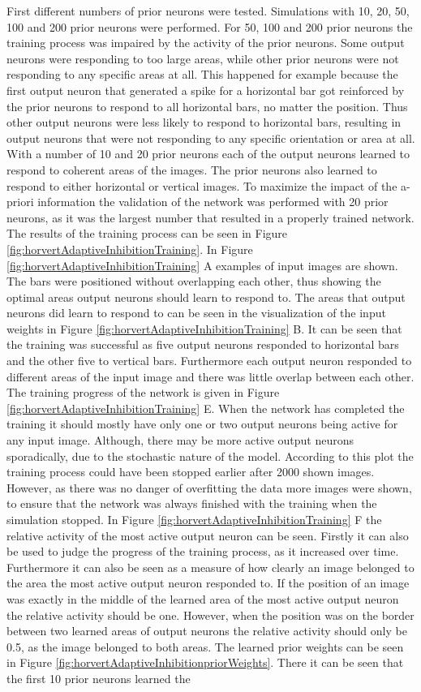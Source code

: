 First different numbers of prior neurons were tested. Simulations with 10, 20, 50, 100 and 200 prior neurons were performed. For 50, 100 and 200 prior neurons the training process was impaired by the activity of the prior neurons. Some output neurons were responding to too large areas, while other prior neurons were not responding to any specific areas at all. This happened for example because the first output neuron that generated a spike for a horizontal bar got reinforced by the prior neurons to respond to all horizontal bars, no matter the position. Thus other output neurons were less likely to respond to horizontal bars, resulting in output neurons that were not responding to any specific orientation or area at all. With a number of 10 and 20 prior neurons each of the output neurons learned to respond to coherent areas of the images. The prior neurons also learned to respond to either horizontal or vertical images. To maximize the impact of the a-priori information the validation of the network was performed with 20 prior neurons, as it was the largest number that resulted in a properly trained network. The results of the training process can be seen in Figure \ref{fig:horvertAdaptiveInhibitionTraining}. In Figure \ref{fig:horvertAdaptiveInhibitionTraining} A examples of input images are shown. The bars were positioned without overlapping each other, thus showing the optimal areas output neurons should learn to respond to. The areas that output neurons did learn to respond to can be seen in the visualization of the input weights in Figure \ref{fig:horvertAdaptiveInhibitionTraining} B. It can be seen that the training was successful as five output neurons responded to horizontal bars and the other five to vertical bars. Furthermore each output neuron responded to different areas of the input image and there was little overlap between each other. The training progress of the network is given in Figure \ref{fig:horvertAdaptiveInhibitionTraining} E. When the network has completed the training it should mostly have only one or two output neurons being active for any input image. Although, there may be more active output neurons sporadically, due to the stochastic nature of the model. According to this plot the training process could have been stopped earlier after 2000 shown images. However, as there was no danger of overfitting the data more images were shown, to ensure that the network was always finished with the training when the simulation stopped. In Figure \ref{fig:horvertAdaptiveInhibitionTraining} F the relative activity of the most active output neuron can be seen. Firstly it can also be used to judge the progress of the training process, as it increased over time. Furthermore it can also be seen as a measure of how clearly an image belonged to the area the most active output neuron responded to. If the position of an image was exactly in the middle of the learned area of the most active output neuron the relative activity should be one. However, when the position was on the border between two learned areas of output neurons the relative activity should only be 0.5, as the image belonged to both areas. The learned prior weights can be seen in Figure \ref{fig:horvertAdaptiveInhibitionpriorWeights}. There it can be seen that the first 10 prior neurons learned the 